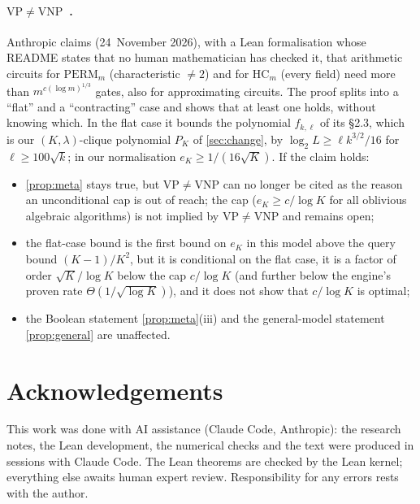 \documentclass[10pt]{amsart}
\theoremstyle{plain}
\theoremstyle{definition}
\theoremstyle{remark}
\numberwithin{equation}{section}
\begin{document}
\paragraph{$\mathrm{VP}\ne\mathrm{VNP}$~\cite{AnthropicVP26}.} Anthropic claims (24~November 2026),
with a Lean formalisation whose README states that no human mathematician has checked it, that
arithmetic circuits for $\mathrm{PERM}_m$ (characteristic $\ne2$) and for $\mathrm{HC}_m$ (every
field) need more than $m^{c(\log m)^{1/3}}$ gates, also for approximating circuits. The proof splits
into a ``flat'' and a ``contracting'' case and shows that at least one holds, without knowing which.
In the flat case it bounds the polynomial $f_{k,\ell}$ of its \S2.3, which is our $(K,\lambda)$-clique
polynomial $P_K$ of \cref{sec:change}, by $\log_2L\ge\ell k^{3/2}/16$ for $\ell\ge100\sqrt k$; in our
normalisation $e_K\ge1/(16\sqrt K)$. If the claim holds:
\begin{itemize}
\item \cref{prop:meta} stays true, but $\mathrm{VP}\ne\mathrm{VNP}$ can no longer be cited as the
reason an unconditional cap is out of reach; the cap ($e_K\ge c/\log K$ for all oblivious algebraic
algorithms) is not implied by $\mathrm{VP}\ne\mathrm{VNP}$ and remains open;
\item the flat-case bound is the first bound on $e_K$ in this model above the query bound
$(K-1)/K^2$, but it is conditional on the flat case, it is a factor of order $\sqrt K/\log K$ below
the cap $c/\log K$ (and further below the engine's proven rate $\Theta(1/\sqrt{\log K})$), and it does not show that $c/\log K$ is optimal;
\item the Boolean statement \cref{prop:meta}(iii) and the general-model statement
\cref{prop:general} are unaffected.
\end{itemize}

\section*{Acknowledgements}
This work was done with AI assistance (Claude Code, Anthropic): the research notes, the Lean
development, the numerical checks and the text were produced in sessions with Claude Code. The Lean
theorems are checked by the Lean kernel; everything else awaits human expert review. Responsibility for
any errors rests with the author.
\end{document}
